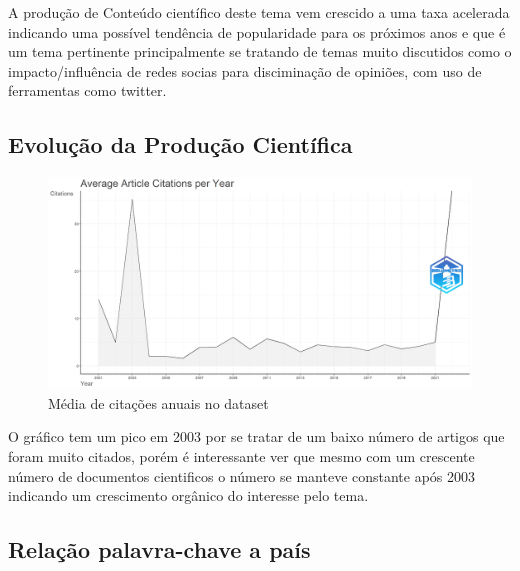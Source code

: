 A produção de Conteúdo científico deste tema vem crescido a uma taxa acelerada indicando uma possível tendência de popularidade para os próximos anos e que é um tema pertinente principalmente se tratando de temas muito discutidos como o impacto/influência de redes socias para disciminação de opiniões, com uso de ferramentas como twitter.

\subsection{Evolução da Produção Científica}

\begin{figure}
    \centering
    \includegraphics[width=1\textwidth]{exploratory-data-analysis/gabrielligoski/PesqBibliogr/ColorPatches/AverageArticleCitationPerYear-2022-12-06.png}
    \caption{Média de citações anuais no dataset}
    \label{fig:cit:anual:gabrielligoski}
\end{figure}

O gráfico tem um pico em 2003 por se tratar de um baixo número de artigos que foram muito citados, porém é interessante ver que mesmo com um crescente número de documentos cientificos o número se manteve constante após 2003 indicando um crescimento orgânico do interesse pelo tema.


\subsection{Relação palavra-chave a país}

